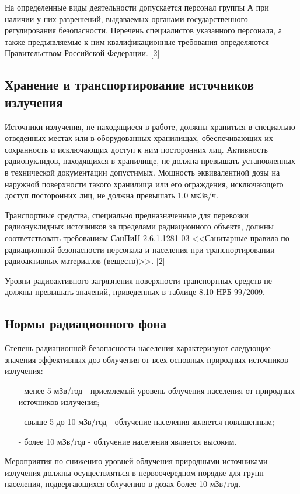 	На определенные виды деятельности допускается персонал группы А при наличии 
	у них разрешений, выдаваемых органами государственного регулирования 
	безопасности. Перечень специалистов указанного персонала, а также 
	предъявляемые к ним квалификационные требования определяются Правительством 
	Российской Федерации. [2]

\subsection{Хранение и транспортирование источников излучения} 
\label{subsect1_1_5}
	Источники излучения, не находящиеся в работе, должны храниться в 
	специально отведенных местах или в оборудованных хранилищах, 
	обеспечивающих их сохранность и исключающих доступ к ним посторонних лиц. 
	Активность радионуклидов, находящихся в хранилище, не должна превышать 
	установленных в технической документации допустимых. Мощность эквивалентной 
	дозы на наружной поверхности такого хранилища или его ограждения, 
	исключающего доступ посторонних лиц, не должна превышать 1,0 мкЗв/ч.

	Транспортные средства, специально предназначенные для перевозки 
	радионуклидных источников за пределами радиационного объекта, должны 
	соответствовать требованиям СанПиН 2.6.1.1281-03 <<Санитарные правила по 
	радиационной безопасности персонала и населения при транспортировании 
	радиоактивных материалов (веществ)>>. [2]

	Уровни радиоактивного загрязнения поверхности транспортных средств не 
	должны превышать значений, приведенных в таблице 8.10 НРБ-99/2009.

\subsection{Нормы радиационного фона} \label{subsect1_1_6}
	Степень радиационной безопасности населения характеризуют следующие 
	значения эффективных доз облучения от всех основных природных источников 
	излучения:
	\begin{itemize}
		\item[-] менее 5 мЗв/год - приемлемый уровень облучения населения 
			от природных источников излучения;
		\item[-] свыше 5 до 10 мЗв/год - облучение населения является 
			повышенным;
		\item[-] более 10 мЗв/год - облучение населения является высоким.
	\end{itemize}

	Мероприятия по снижению уровней облучения природными источниками излучения 
	должны осуществляться в первоочередном порядке для групп населения, 
	подвергающихся облучению в дозах более 10 мЗв/год.

